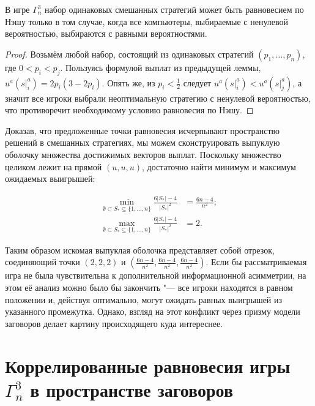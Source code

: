 \begin{lemma}
	В игре $\Gamma^3_n$ набор одинаковых смешанных стратегий может быть равновесием по Нэшу только в том случае, когда все компьютеры, выбираемые с ненулевой вероятностью, выбираются с равными вероятностями.
\end{lemma}

\begin{proof}
	Возьмём любой набор, состоящий из одинаковых стратегий $(p_1, \ldots, p_n)$, где $0 < p_i < p_j$. Пользуясь формулой выплат из предыдущей леммы, $u^a(\left. s \right|^a_i) = 2 p_i (3 - 2 p_i)$. Опять же, из $p_i < \frac{1}{2}$ следует $u^a(\left. s \right|^a_i) < u^a(\left. s \right|^a_j)$, а значит все игроки выбрали неоптимальную стратегию с ненулевой вероятностью, что противоречит необходимому условию равновесия по Нэшу.
\end{proof}

Доказав, что предложенные точки равновесия исчерпывают пространство решений в смешанных стратегиях, мы можем сконструировать выпуклую оболочку множества достижимых векторов выплат. Поскольку множество целиком лежит на прямой $(u, u, u)$, достаточно найти минимум и максимум ожидаемых выигрышей:

\begin{align*}
	\min_{\emptyset \subset S_* \subseteq \{1,\ldots,n\}} \frac{6 \left| S_* \right| - 4}{\left| S_* \right|^2} &= \frac{6 n - 4}{n^2};\\
	\max_{\emptyset \subset S_* \subseteq \{1,\ldots,n\}} \frac{6 \left| S_* \right| - 4}{\left| S_* \right|^2} &= 2.
\end{align*}

Таким образом искомая выпуклая оболочка представляет собой отрезок, соединяющий точки $(2, 2, 2)$ и $(\frac{6 n - 4}{n^2}, \frac{6 n - 4}{n^2}, \frac{6 n - 4}{n^2})$. Если бы рассматриваемая игра не была чувствительна к дополнительной информационной асимметрии, на этом её анализ можно было бы закончить "--- все игроки находятся в равном положении и, действуя оптимально, могут ожидать равных выигрышей из указанного промежутка. Однако, взгляд на этот конфликт через призму модели заговоров делает картину происходящего куда интереснее.

\section{Коррелированные равновесия игры $\Gamma^3_n$ в пространстве заговоров}\label{sec:ch2/sec4}

